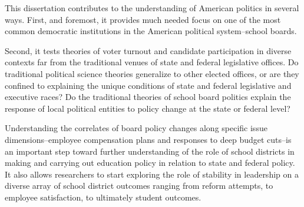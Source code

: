 This dissertation contributes to the understanding of American politics in several 
ways. First, and foremost, it provides much needed focus on one of the most common 
democratic institutions in the American political system--school boards. 

Second, it tests theories of voter turnout and candidate participation in diverse 
contexts far from the traditional venues of state and federal legislative offices. 
Do traditional political science theories generalize to other elected offices, or 
are they confined to explaining the unique conditions of state and federal legislative 
and executive races? Do the traditional theories of school board politics explain 
the response of local political entities to policy change at the state or federal 
level?

Understanding the correlates of board policy changes along specific issue 
dimensions--employee compensation plans and responses to deep budget cuts--is an 
important step toward further understanding of the role of school districts in 
making and carrying out education policy in relation to state and federal policy. 
It also allows researchers to start exploring the role of stability in leadership 
on a diverse array of school district outcomes ranging from reform attempts, to 
employee satisfaction, to ultimately student outcomes.  



